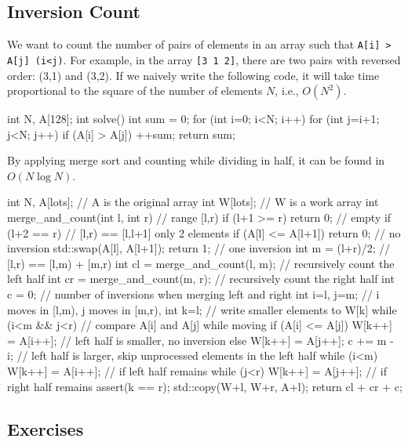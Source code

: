 \subsection{Inversion Count}

We want to count the number of pairs of elements in an array such that \texttt{A[i] > A[j] (i<j)}.
For example, in the array \texttt{[3 1 2]}, there are two pairs with reversed order: (3,1) and (3,2).
If we naively write the following code, it will take time proportional to the square of the number of elements $N$, i.e., $O(N^2)$.

\begin{cbox}
int N, A[128];
int solve() {
    int sum = 0;
    for (int i=0; i<N; i++)
        for (int j=i+1; j<N; j++)
            if (A[i] > A[j]) ++sum;
    return sum;
}
\end{cbox}

By applying merge sort and counting while dividing in half, it can be found in $O(N\log N)$.

\begin{cbox}[emph={merge\_and\_count}]
int N, A[lots]; // A is the original array
int W[lots]; // W is a work array
int merge\_and\_count(int l, int r) { // range [l,r)
    if (l+1 >= r) return 0; // empty
    if (l+2 == r) { // [l,r) == [l,l+1] only 2 elements
        if (A[l] <= A[l+1]) return 0;  // no inversion
        std::swap(A[l], A[l+1]);
        return 1; // one inversion
    }
    int m = (l+r)/2; // [l,r) == [l,m) + [m,r)
    int cl = merge\_and\_count(l, m); // recursively count the left half
    int cr = merge\_and\_count(m, r); // recursively count the right half
    int c = 0; // number of inversions when merging left and right
    int i=l, j=m; // i moves in [l,m), j moves in [m,r),
    int k=l;      // write smaller elements to W[k]
    while (i<m && j<r) { // compare A[i] and A[j] while moving
        if (A[i] <= A[j]) W[k++] = A[i++]; // left half is smaller, no inversion
        else {
            W[k++] = A[j++];
            c += m - i; // left half is larger, skip unprocessed elements in the left half
        }
    }
    while (i<m) W[k++] = A[i++]; // if left half remains
    while (j<r) W[k++] = A[j++]; // if right half remains
    assert(k == r);
    std::copy(W+l, W+r, A+l);
    return cl + cr + c;
}
\end{cbox}
\subsection{Exercises}

